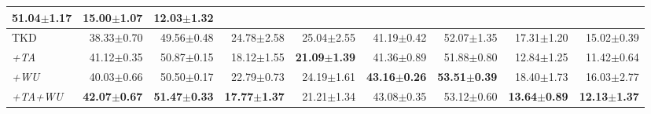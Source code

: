 \begin{appendix}
\begin{table*}[!th]
{\begin{tabular}{@{}lrrrrrrrr@{}}
  51.04$\pm$1.17 &
  15.00$\pm$1.07 &
  12.03$\pm$1.32 \\ \midrule
TKD &
  38.33$\pm$0.70 &
  49.56$\pm$0.48 &
  24.78$\pm$2.58 &
  25.04$\pm$2.55 &
  41.19$\pm$0.42 &
  52.07$\pm$1.35 &
  17.31$\pm$1.20 &
  15.02$\pm$0.39 \\
\textit{+TA} &
  41.12$\pm$0.35 &
  50.87$\pm$0.15 &
  18.12$\pm$1.55 &
  \textbf{21.09$\pm$1.39} &
  41.36$\pm$0.89 &
  51.88$\pm$0.80 &
  12.84$\pm$1.25 &
  11.42$\pm$0.64 \\
\textit{+WU} &
  40.03$\pm$0.66 &
  50.50$\pm$0.17 &
  22.79$\pm$0.73 &
  24.19$\pm$1.61 &
  \textbf{43.16$\pm$0.26} &
  \textbf{53.51$\pm$0.39} &
  18.40$\pm$1.73 &
  16.03$\pm$2.77 \\
\textit{+TA+WU} &
  \textbf{42.07$\pm$0.67} &
  \textbf{51.47$\pm$0.33} &
  \textbf{17.77$\pm$1.37} &
  21.21$\pm$1.34 &
  43.08$\pm$0.35 &
  53.12$\pm$0.60 &
  \textbf{13.64$\pm$0.89} &
  \textbf{12.13$\pm$1.37} \\
  

\end{tabular}}
\end{table*}
\end{appendix}
